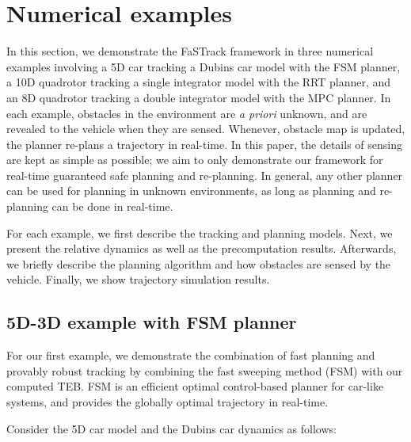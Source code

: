 \section{Numerical examples}

In this section, we demonstrate the FaSTrack framework in three numerical examples involving a 5D car tracking a Dubins car model with the FSM planner, a 10D quadrotor tracking a single integrator model with the RRT planner, and an 8D quadrotor tracking a double integrator model with the MPC planner.
In each example, obstacles in the environment are \textit{a priori} unknown, and are revealed to the vehicle when they are sensed.
Whenever, obstacle map is updated, the planner re-plans a trajectory in real-time.
In this paper, the details of sensing are kept as simple as possible; we aim to only demonstrate our framework for real-time guaranteed safe planning and re-planning.
In general, any other planner can be used for planning in unknown environments, as long as planning and re-planning can be done in real-time.

For each example, we first describe the tracking and planning models. 
Next, we present the relative dynamics as well as the precomputation results. 
Afterwards, we briefly describe the planning algorithm and how obstacles are sensed by the vehicle. 
Finally, we show trajectory simulation results.

\subsection{5D-3D example with FSM planner \label{sec:reach_planner}}

For our first example, we demonstrate the combination of fast planning and provably robust tracking by combining the fast sweeping method (FSM) \cite{} with our computed TEB. 
FSM is an efficient optimal control-based planner for car-like systems, and provides the globally optimal trajectory in real-time.

Consider the 5D car model and the Dubins car dynamics as follows:

